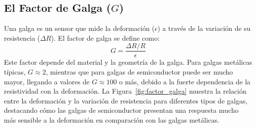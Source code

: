 \subsection{El Factor de Galga ($G$)}
Una galga es un sensor que mide la deformación ($\epsilon$) a través de la variación de su resistencia ($\Delta R$). El factor de galga se define como:
\begin{equation}
    G = \frac{\Delta R / R}{\epsilon}
\end{equation}
Este factor depende del material y la geometría de la galga. Para galgas metálicas típicas, $G \approx 2$, mientras que para galgas de semiconductor puede ser mucho mayor, llegando a valores de $G \approx 100$ o más, debido a la fuerte dependencia de la resistividad con la deformación. La Figura~\ref{fig:factor_galga} muestra la relación entre la deformación y la variación de resistencia para diferentes tipos de galgas, destacando cómo las galgas de semiconductor presentan una respuesta mucho más sensible a la deformación en comparación con las galgas metálicas.



